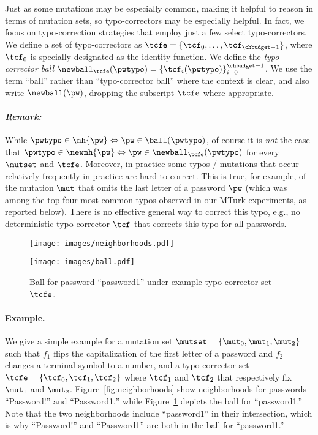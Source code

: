 Just as some mutations may be especially common, making it helpful to reason in
terms of mutation sets, so typo-correctors may be especially helpful. In fact,
we focus on typo-correction strategies that employ just a few select
typo-correctors. We define a set of typo-correctors as $\tcfe = \{\tcf_0,
\ldots, \tcf_{\chbudget-1}\}$, where $\tcf_0$ is specially designated as the
identity function. We define the {\em typo-corrector ball}
$\newball_{\tcfe}(\pwtypo) = \{\tcf_i(\pwtypo)\}_{i=0}^{\chbudget-1}$.  We use
the term ``ball'' rather than ``typo-corrector ball'' where the context is
clear, and also write $\newball(\pw)$, dropping the subscript $\tcfe$ where
appropriate.

\paragraph{\em Remark:} While
$\pwtypo \in \nh{\pw} \Leftrightarrow \pw \in \ball(\pwtypo)$, of
course it is {\em not} the case that
$\pwtypo \in \newnh{\pw} \Leftrightarrow \pw \in
\newball_{\tcfe}(\pwtypo)$
for every $\mutset$ and $\tcfe$. Moreover, in practice some typos /
mutations that occur relatively frequently in practice are hard to
correct. This is true, for example, of the mutation $\mut$ that omits
the last letter of a password $\pw$ (which was among the top four most
common typos observed in our MTurk experiments, as reported
below). There is no effective general way to correct this typo, e.g.,
no deterministic typo-corrector $\tcf$ that corrects this typo for all
passwords.

\begin{figure*}[t]
\centering
\begin{minipage}[b]{.35\textwidth}
  \texttt{[image: images/neighborhoods.pdf]}\vspace{-7mm}
\caption{Neighborhoods for passwords ``Password!'' and ``Password1'' under example mutation set $\mutset$.}\label{fig:neighborhoods}
\end{minipage}\qquad
\begin{minipage}[b]{.35\textwidth}
 \texttt{[image: images/ball.pdf]}\vspace{-7mm}
\caption{Ball for password ``password1'' under example typo-corrector set $\tcfe$.}\label{fig:ball}
\end{minipage}
\end{figure*}

\paragraph{Example.} We give a simple example for a mutation set $\mutset = \{\mut_0, \mut_1, \mut_2\}$ such that $f_1$ flips the capitalization of the first letter of a password and $f_2$ changes a terminal symbol to a number,  and a typo-corrector set $\tcfe = \{\tcf_0, \tcf_1, \tcf_2\}$ where $\tcf_1$ and $\tcf_2$ that respectively fix $\mut_1$ and $\mut_2$. Figure~\ref{fig:neighborhoods} show neighborhoods for passwords ``Password!'' and ``Password1,'' while Figure~\ref{fig:ball} depicts the ball for ``password1.'' Note that the two neighborhoods include ``password1'' in their intersection, which is why ``Password!'' and ``Password1'' are both in the ball for ``password1.''

